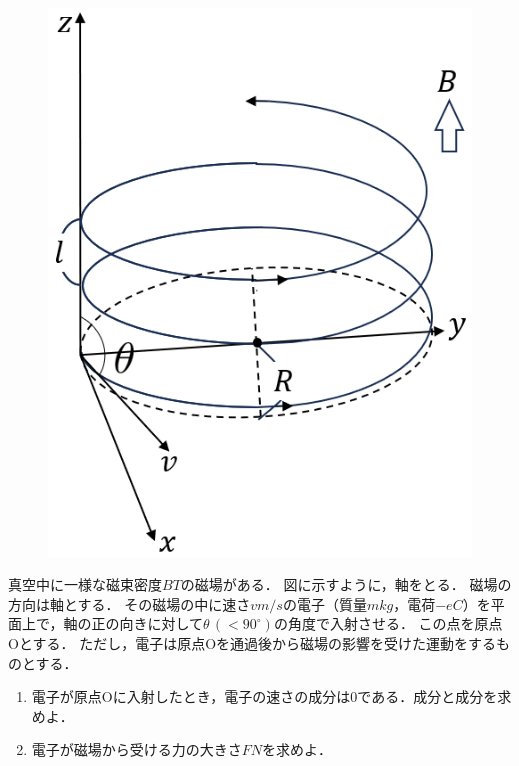 {\begin{figure}
  \vspace*{-\intextsep}
  \includegraphics[width=12zw]{../graphs/jumon_123.png}
\end{figure}
真空中に一様な磁束密度$B\unit{T}$の磁場がある．
図に示すように，\xyz 軸をとる．
磁場の方向は\z 軸とする．
その磁場の中に速さ\mbox{$v\unit{m/s}$}の電子（質量$m\unit{kg}$，電荷$-e\unit{C}$）を\zx 平面上で，\z 軸の正の向きに対して$\theta\,(<90^\circ)$の角度で入射させる．
この点を原点Oとする．
ただし，電子は原点Oを通過後から磁場の影響を受けた運動をするものとする．

\begin{enumerate}[（1）]
  \setlength{\leftskip}{-1.5zw}
  \setlength{\itemindent}{1zw}\setlength{\labelsep}{0.5zw}
  \setlength{\labelwidth}{1zw}\setlength{\leftmargin}{1zw}
  \setlength{\itemsep}{0.5\baselineskip}
  \item 電子が原点Oに入射したとき，電子の速さの\y 成分は0である．\x 成分と\z 成分を求めよ．
  \item 電子が磁場から受ける力の大きさ$F\unit{N}$を求めよ．
\end{enumerate}

\par}
